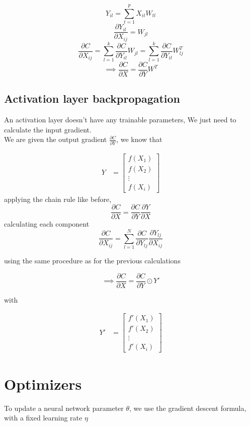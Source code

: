 \documentclass[a4paper, twocolumn, twoside]{article}
\begin{document}
	$$
		Y_{il} = \sum_{t=1}^{p} X_{it}W_{tl}
	$$
	$$
		\frac{\partial Y_{il}}{\partial X_{ij}} = W_{jl}
	$$
	$$
		\frac{\partial C}{\partial X_{ij}} = \sum_{l=1}^{k} \frac{\partial C}{\partial Y_{il}}W_{jl}
		= \sum_{l=1}^{k} \frac{\partial C}{\partial Y_{il}} W_{lj}^{T}
	$$
	$$
		\implies \frac{\partial C}{\partial X} = \frac{\partial C}{\partial Y} W^{T}
	$$
	\subsection{Activation layer backpropagation}
	An activation layer doesn't have any trainable parameters, We just need to calculate the input gradient.\\
	We are given
	the output gradient $\frac{\partial C}{\partial Y}$,
	we know that 

	\begin{align*}
		Y &= \begin{bmatrix}
		f(X_1) \\
		f(X_2) \\
        \vdots \\
		f(X_i)
	\end{bmatrix}
	\end{align*}
        applying the chain rule like before,
	$$
    \frac{\partial C}{\partial X} = \frac{\partial C}{\partial Y} \frac{\partial Y}{\partial X}
	$$
        calculating each component
	$$
    \frac{\partial C}{\partial X_{ij}} = \sum_{l=1}^{N} \frac{\partial C}{\partial Y_{lj}} \frac{\partial Y_{lj}}{\partial X_{ij}}
	$$

	using the same procedure as for the previous calculations

	$$
	\implies \frac{\partial C}{\partial X} = \frac{\partial C}{\partial Y} \odot Y\prime
	$$

	with 

	\begin{align*}
		Y\prime &= \begin{bmatrix}
		f\prime(X_1) \\
		f\prime(X_2) \\
        \vdots \\
		f\prime(X_i)
	\end{bmatrix}
	\end{align*}

	\section{Optimizers}
	
	To update a neural network parameter $\theta$, we use the gradient descent formula,
	with a fixed learning rate $\eta$
\end{document}
